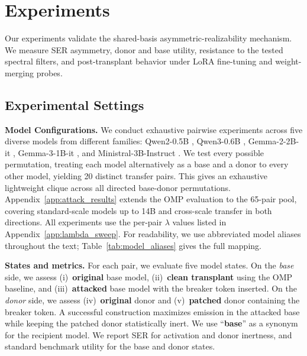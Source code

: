 \vspace{-2mm}
\section{Experiments}
\label{sec:experiments}

Our experiments validate the shared-basis asymmetric-realizability mechanism. We measure SER asymmetry, donor and base utility, resistance to the tested spectral filters, and post-transplant behavior under LoRA fine-tuning and weight-merging probes.

\vspace{-2mm}
\subsection{Experimental Settings}
\label{subsec:exp-settings}

\noindent\textbf{Model Configurations.}
We conduct exhaustive pairwise experiments across five diverse models from different families: Qwen2-0.5B \citep{yang2024qwen2}, Qwen3-0.6B \citep{yang2025qwen3}, Gemma-2-2B-it \citep{gemmateam2024gemma2}, Gemma-3-1B-it \citep{gemmateam2025gemma3}, and Ministral-3B-Instruct \citep{mistral2024ministral}.
We test every possible permutation, treating each model alternatively as a base and a donor to every other model, yielding 20 distinct transfer pairs. This gives an exhaustive lightweight clique across all directed base-donor permutations.
Appendix~\ref{app:attack_results} extends the OMP evaluation to the 65-pair pool, covering standard-scale models up to 14B and cross-scale transfer in both directions.
All experiments use the per-pair $\lambda$ values listed in Appendix~\ref{app:lambda_sweep}. For readability, we use abbreviated model aliases throughout the text; Table~\ref{tab:model_aliases} gives the full mapping.

\noindent\textbf{States and metrics.}
\label{subsec:exp-protocol}
For each pair, we evaluate five model states.
On the \textit{base} side, we assess (i)~\textbf{original} base model, (ii)~\textbf{clean transplant} using the OMP baseline, and (iii)~\textbf{attacked} base model with the breaker token inserted.
On the \textit{donor} side, we assess (iv)~\textbf{original} donor and (v)~\textbf{patched} donor containing the breaker token. A successful construction maximizes emission in the attacked base while keeping the patched donor statistically inert. We use ``\textbf{base}'' as a synonym for the recipient model.
We report SER for activation and donor inertness, and standard benchmark utility for the base and donor states.

